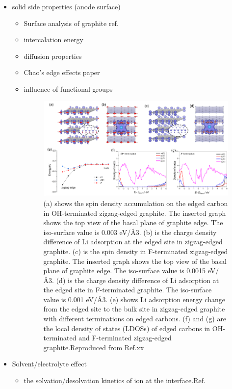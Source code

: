\documentclass[journal=jacsat,manuscript=article]{achemso}
\begin{document}
\begin{itemize}
    \item solid side properties (anode surface)
    \begin{itemize}
        \item Surface analysis of graphite ref. 
        \item intercalation energy

        \item diffusion properties

        \item Chao's edge effects paper
        \item influence of functional groups
        
        \begin{figure}
            \centering            \includegraphics[scale=0.5]{figures/functional groups.PNG}
            \caption{(a) shows the spin density accumulation on the edged carbon in OH-terminated zigzag-edged graphite. The inserted graph shows the top view of the basal plane of graphite edge. The iso-surface value is 0.003 eV/Å3. (b) is the charge density difference of Li adsorption at the edged site in zigzag-edged graphite. (c) is the spin density in F-terminated zigzag-edged graphite. The inserted graph shows the top view of the basal plane of graphite edge. The iso-surface value is 0.0015 eV/Å3. (d) is the charge density difference of Li adsorption at the edged site in F-terminated graphite. The iso-surface value is 0.001 eV/Å3. (e) shows Li adsorption energy change from the edged site to the bulk site in zigzag-edged graphite with different terminations on edged carbons. (f) and (g) are the local density of states (LDOSs) of edged carbons in OH-terminated and F-terminated zigzag-edged graphite.Reproduced from Ref.xx}
            \label{fig:my_label}
        \end{figure}
    \end{itemize}
    \item Solvent/electrolyte effect 
    \begin{itemize}
        \item the solvation/desolvation kinetics of ion at the interface.Ref. 
        

\end{itemize}
\end{itemize}
\end{document}
